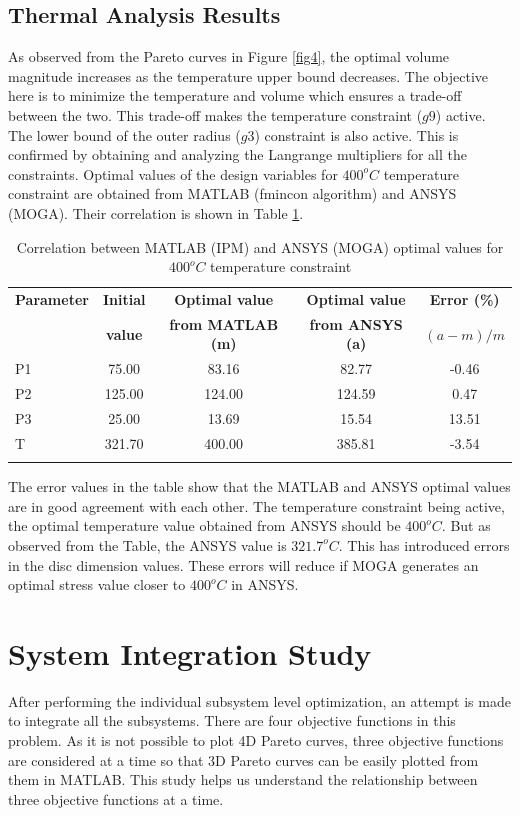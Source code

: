 \documentclass[12pt]{article}
\begin{document}
\subsection{Thermal Analysis Results}
As observed from the Pareto curves in Figure \ref{fig4}, the optimal volume magnitude increases as the temperature upper bound decreases. The objective here is to minimize the temperature and volume which ensures a trade-off between the two. This trade-off makes the temperature constraint ($g9$) active. The lower bound of the outer radius ($g3$) constraint is also active. This is confirmed by obtaining and analyzing the Langrange multipliers for all the constraints. Optimal values of the design variables for $400^{o}C$ temperature constraint are obtained from MATLAB (fmincon algorithm) and ANSYS (MOGA). Their correlation is shown in Table \ref{corr3}.
\newpage
\begin{longtable}{|l|c|c|c|c|}
\hline 
\textbf{Parameter} & \textbf{Initial} & \textbf{Optimal value} & \textbf{Optimal value} & \textbf{Error (\%)} \\
 & \textbf{value} & \textbf{from MATLAB (m)} & \textbf{from ANSYS (a)} & \textbf{$(a-m)/m$}\\
\hline
P1 & 75.00 & 83.16 & 82.77 & -0.46 \\
\hline
P2 & 125.00 & 124.00 & 124.59 & 0.47 \\
\hline
P3 & 25.00 & 13.69 & 15.54 & 13.51\\
\hline
T & 321.70 & 400.00 & 385.81 & -3.54 \\
\hline
\caption{Correlation between MATLAB (IPM) and ANSYS (MOGA) optimal values for $400^{o}C$ temperature constraint}
\label{corr3}
\end{longtable}
The error values in the table show that the MATLAB and ANSYS optimal values are in good agreement with each other. The temperature constraint being active, the optimal temperature value obtained from ANSYS should be $400^{o}C$. But as observed from the Table, the ANSYS value is $321.7^{o}C$. This has introduced errors in the disc dimension values. These errors will reduce if MOGA generates an optimal stress value closer to $400^{o}C$ in ANSYS.

\section{System Integration Study}
After performing the individual subsystem level optimization, an attempt is made to integrate all the subsystems. There are four objective functions in this problem. As it is not possible to plot 4D Pareto curves, three objective functions are considered at a time so that 3D Pareto curves can be easily plotted from them in MATLAB. This study helps us understand the relationship between three objective functions at a time.
\end{document}
